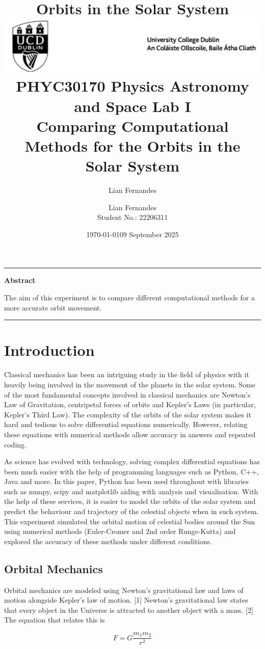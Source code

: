 \documentclass[12 pt, a4paper]{article}
\title{\bfseries Orbits in the Solar System}
\author{Lian Fernandes}
\date{\today}
\title{%
\includegraphics[width=0.9\linewidth]{UCD_Logo.png}\\ %
{\large PHYC30170 Physics Astronomy and Space Lab I}\\ %
{\bfseries Comparing Computational Methods for the Orbits in the Solar System} %
}
\author{Lian Fernandes \\ \small Student No.: 22206311}
\date{09 September 2025}
\renewenvironment{abstract}{%
  \par\noindent\rule{\linewidth}{0.4pt}\par
  \begin{center}\bfseries Abstract\end{center}%
}{%
  \par\rule{\linewidth}{0.4pt}\par
}
\begin{document}
\maketitle

\begin{abstract}

The aim of this experiment is to compare different computational methods for a more accurate orbit movement.

\end{abstract}

\section{Introduction}
Classical mechanics has been an intriguing study in the field of physics with it heavily being involved in the movement
of the planets in the solar system. Some of the most fundamental concepts involved in classical mechanics are Newton's Law
of Gravitation, centripetal forces of orbits and Kepler's Laws (in particular, Kepler's Third Law). The complexity of the orbits
of the solar system makes it hard and tedious to solve differential equations numerically. However, relating these equations with
numerical methods allow accuracy in answers and repeated coding.

As science has evolved with technology, solving complex differential equations has been much easier with the help of programming languages 
such as Python, C++, Java and more. In this paper, Python has been used throughout with libraries such as numpy, scipy and matplotlib
aiding with analysis and visualisation. With the help of these services, it is easier to model the orbits of the solar system and predict
the behaviour and trajectory of the celestial objects when in such system. This experiment simulated the orbital motion of celestial bodies 
around the Sun using numerical methods (Euler-Cromer and 2nd order Runge-Kutta) and explored the accuracy of these methods under different conditions.

\subsection{Orbital Mechanics}
Orbital mechanics are modeled using Newton's gravitational law and laws of motion alongside Kepler's law of motion. [1] Newton's gravitational 
law states that every object in the Universe is attracted to another object with a mass. [2] The equation that relates this is

\[
F = G \frac{m_1m_2}{r^2}
\tag{Eq. 1a}
\]
\end{document}
